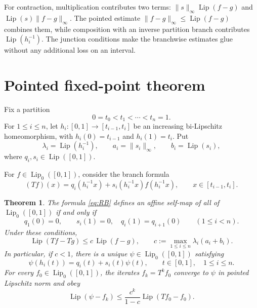 \documentclass[11pt]{article}
\newtheorem{theorem}{Theorem}
\newcommand{\Lip}{\operatorname{Lip}}
\newcommand{\Lipz}{\operatorname{Lip}_0}
\begin{document}
For contraction, multiplication contributes two terms:
$\|s\|_\infty\Lip(f-g)$ and $\Lip(s)\|f-g\|_\infty$.
The pointed estimate $\|f-g\|_\infty\leq\Lip(f-g)$ combines them, while
composition with an inverse partition branch contributes
$\Lip(h_i^{-1})$.  The junction conditions make the branchwise estimates glue
without any additional loss on an interval.

\section*{Pointed fixed-point theorem}

Fix a partition
\[
  0=t_0<t_1<\cdots<t_n=1.
\]
For $1\leq i\leq n$, let
$h_i:[0,1]\to[t_{i-1},t_i]$ be an increasing bi-Lipschitz homeomorphism,
with $h_i(0)=t_{i-1}$ and $h_i(1)=t_i$.  Put
\[
  \lambda_i=\Lip(h_i^{-1}),\qquad
  a_i=\|s_i\|_\infty,\qquad b_i=\Lip(s_i),
\]
where $q_i,s_i\in\Lip([0,1])$.

For $f\in\Lipz([0,1])$, consider the branch formula
\begin{equation}\label{eq:RB}
 (Tf)(x)=q_i(h_i^{-1}x)+s_i(h_i^{-1}x)f(h_i^{-1}x),
 \qquad x\in[t_{i-1},t_i].
\end{equation}

\begin{theorem}\label{thm:main}
The formula \eqref{eq:RB} defines an affine self-map of all of
$\Lipz([0,1])$ if and only if
\begin{equation}\label{eq:join}
 q_1(0)=0,\qquad
 s_i(1)=0,\quad q_i(1)=q_{i+1}(0)\qquad(1\leq i<n).
\end{equation}
Under these conditions,
\begin{equation}\label{eq:constant}
 \Lip(Tf-Tg)\leq c\,\Lip(f-g),
 \qquad
 c:=\max_{1\leq i\leq n}\lambda_i(a_i+b_i).
\end{equation}
In particular, if $c<1$, there is a unique
$\psi\in\Lipz([0,1])$ satisfying
\begin{equation}\label{eq:selfref}
 \psi(h_i(t))=q_i(t)+s_i(t)\psi(t),
 \qquad t\in[0,1],\quad 1\leq i\leq n.
\end{equation}
For every $f_0\in\Lipz([0,1])$, the iterates $f_k=T^k f_0$ converge to
$\psi$ in pointed Lipschitz norm and obey
\begin{equation}\label{eq:error}
 \Lip(\psi-f_k)\leq \frac{c^k}{1-c}\Lip(Tf_0-f_0).
\end{equation}
\end{theorem}
\end{document}
